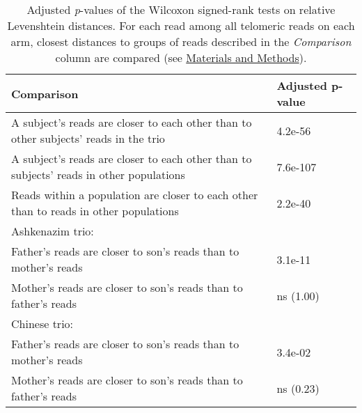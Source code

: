 \begin{samepage} \begin{table}[h!] \small \begin{tabular}{ll}
\hline
\textbf{Comparison}                                                                     & \textbf{Adjusted p-value} \\
\hline
A subject's reads are closer to each other than to other subjects' reads in the trio    & 4.2e-56                   \\
A subject's reads are closer to each other than to subjects' reads in other populations & 7.6e-107                  \\
Reads within a population are closer to each other than to reads in other populations   & 2.2e-40                   \\
Ashkenazim trio:                                                                        & \textbf{}                 \\
\hspace{.5cm} Father's reads are closer to son's reads than to mother's reads           & 3.1e-11                   \\
\hspace{.5cm} Mother's reads are closer to son's reads than to father's reads           & ns (1.00)                 \\
Chinese trio:                                                                           & \textbf{}                 \\
\hspace{.5cm} Father's reads are closer to son's reads than to mother's reads           & 3.4e-02                   \\
\hspace{.5cm} Mother's reads are closer to son's reads than to father's reads           & ns (0.23)                 \\
\hline
\end{tabular}
\caption{
    \small Adjusted \textit{p}-values of the Wilcoxon signed-rank tests on relative Levenshtein distances.
    For each read among all telomeric reads on each arm,
    closest distances to groups of reads described in the \textit{Comparison} column are compared
    (see \hyperref[sec:methods]{Materials and Methods}).
}
\label{tab:haptests}
\end{table}
\end{samepage}
